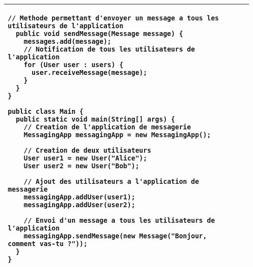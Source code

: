 \begin{table}[H]
\begin{adjustbox}{max width=\textwidth}
\begin{tabular}{l|p{\textwidth}}
\begin{minipage}[tr]{0.5\textwidth}
\begin{minipage}[b]{1\textwidth}
\begin{lstlisting}[style=monstyle]
  // Methode permettant d'envoyer un message a tous les utilisateurs de l'application
  public void sendMessage(Message message) {
    messages.add(message);
    // Notification de tous les utilisateurs de l'application
    for (User user : users) {
      user.receiveMessage(message);
    }
  }
}

public class Main {
  public static void main(String[] args) {
    // Creation de l'application de messagerie
    MessagingApp messagingApp = new MessagingApp();

    // Creation de deux utilisateurs
    User user1 = new User("Alice");
    User user2 = new User("Bob");

    // Ajout des utilisateurs a l'application de messagerie
    messagingApp.addUser(user1);
    messagingApp.addUser(user2);

    // Envoi d'un message a tous les utilisateurs de l'application
    messagingApp.sendMessage(new Message("Bonjour, comment vas-tu ?"));
  }
}

\end{lstlisting}
\end{minipage}
\end{minipage}
\\
\bottomrule
\end{tabular}
\end{adjustbox}
\end{table}